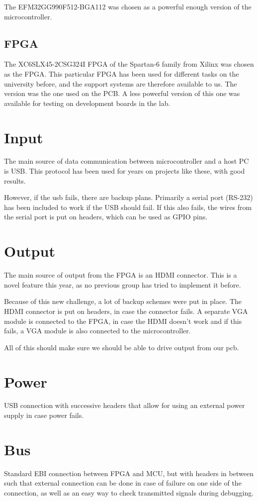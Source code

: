 The EFM32GG990F512-BGA112 was chosen as a powerful enough version of the microcontroller.

\subsection{FPGA}
The XC6SLX45-2CSG324I FPGA of the Spartan-6 family from Xilinx was chosen as the FPGA.
This particular FPGA has been used for different tasks on the university before, and the support systems are therefore available to us.
The version was the one used on the PCB.
A less powerful version of this one was available for testing on development boards in the lab.

\section{Input}

The main source of data communication between microcontroller and a host PC is USB.
This protocol has been used for years on projects like these, with good results. 

However, if the usb fails, there are backup plans.
Primarily a serial port (RS-232) has been included to work if the USB should fail.
If this also fails, the wires from the serial port is put on headers, which can be used as GPIO pins.

\section{Output}
The main source of output from the FPGA is an HDMI connector.
This is a novel feature this year, as no previous group has tried to implement it before.

Because of this new challenge, a lot of backup schemes were put in place.
The HDMI connector is put on headers, in case the connector fails.
A separate VGA module is connected to the FPGA, in case the HDMI doesn't work and if this fails, a VGA module is also connected to the microcontroller.

All of this should make sure we should be able to drive output from our pcb.

\section{Power}
USB connection with successive headers that allow for using an external power supply in case power fails.

\section{Bus}
Standard EBI connection between FPGA and MCU, but with headers in between such that external connection can be done in case of failure on one side of the connection, as well as an easy way to check transmitted signals during debugging.

